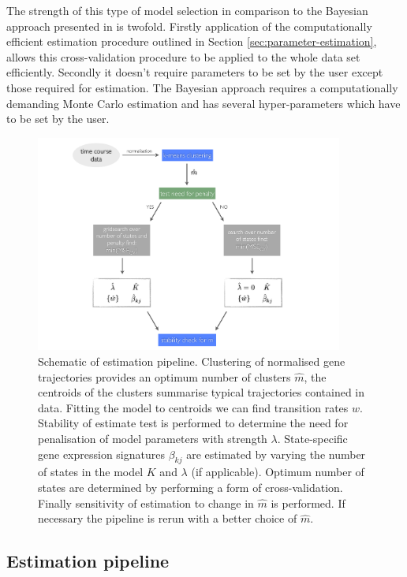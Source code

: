 The strength of this type of model selection in comparison to the Bayesian approach presented in \cite{Armond:2013} is twofold. Firstly application of the computationally efficient estimation procedure outlined in Section \ref{sec:parameter-estimation}, allows this cross-validation procedure to be applied to the whole data set efficiently. Secondly it doesn't require parameters to be set by the user except those required for estimation. The Bayesian approach requires a computationally demanding Monte Carlo estimation and has several hyper-parameters which have to be set by the user. 

\begin{figure}
  \centering
  \includegraphics[width=0.9\textwidth]{pics/pipeline.pdf}
  \caption{Schematic of estimation pipeline. Clustering of normalised gene trajectories provides an optimum number of clusters $\hat{m}$, the centroids of the clusters summarise typical trajectories contained in data. Fitting the model to centroids we can find transition rates $w$. Stability of estimate test is performed to determine the need for penalisation of model parameters with strength $\lambda$. State-specific gene expression signatures $\beta_{kj}$ are estimated by varying the number of states in the model $K$ and $\lambda$ (if applicable). Optimum number of states are determined by performing a form of cross-validation. Finally sensitivity of estimation to change in $\hat{m}$ is performed. If necessary the pipeline is rerun with a better choice of $\hat{m}$.}
  \label{fig:pipeline}
\end{figure}

\subsection{Estimation pipeline}
\label{sec:estim-pipe}

